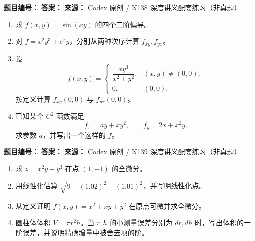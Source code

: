\begin{problemBox}
\begin{problemMeta}
\textbf{题目编号：}  \quad
\textbf{答案：}  \quad
\textbf{来源：} Codex 原创 / K138 深度讲义配套练习（非真题）
\end{problemMeta}
\begin{enumerate}
\item[\textbf{A}] 求 \(f(x,y)=\sin(xy)\) 的四个二阶偏导。
\item[\textbf{B}] 对 \(f=x^2y^3+e^x y\)，分别从两种次序计算 \(f_{xy},f_{yx}\)。
\item[\textbf{C}] 设
\[
f(x,y)=
\begin{cases}
\dfrac{xy^3}{x^2+y^2},&(x,y)\ne(0,0),\\0,&(0,0),
\end{cases}
\]
按定义计算 \(f_{xy}(0,0)\) 与 \(f_{yx}(0,0)\)。
\item[\textbf{M}] 已知某个 \(C^2\) 函数满足
\[
f_x=ay+xy^2,\qquad f_y=2x+x^2y.
\]
求参数 \(a\)，并写出一个这样的 \(f\)。
\end{enumerate}
\end{problemBox}

\begin{problemBox}
\begin{problemMeta}
\textbf{题目编号：}  \quad
\textbf{答案：}  \quad
\textbf{来源：} Codex 原创 / K139 深度讲义配套练习（非真题）
\end{problemMeta}
\begin{enumerate}
\item[\textbf{A}] 求 \(z=x^2y+y^3\) 在点 \((1,-1)\) 的全微分。
\item[\textbf{B}] 用线性化估算
\(\sqrt{9-(1.02)^2-(1.01)^2}\)，并写明线性化点。
\item[\textbf{C}] 从定义证明 \(f(x,y)=x^2+xy+y^2\) 在原点可微并求全微分。
\item[\textbf{M}] 圆柱体体积 \(V=\pi r^2h\)。当 \(r,h\) 的小测量误差分别为
\(dr,dh\) 时，写出体积的一阶误差，并说明精确增量中被舍去项的阶。
\end{enumerate}
\end{problemBox}

